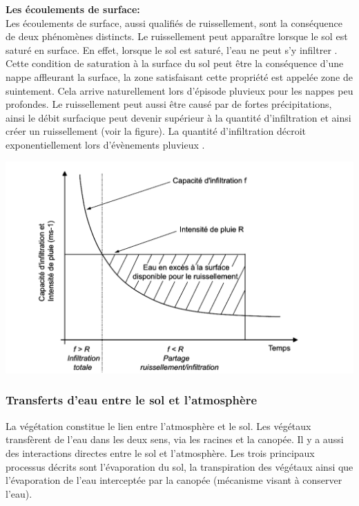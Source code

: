 \documentclass[a4paper,10pt]{article}
\begin{document}
\textbf{Les écoulements de surface:}\\

Les écoulements de surface, aussi qualifiés de ruissellement, sont la conséquence de deux phénomènes distincts. Le ruissellement peut apparaître lorsque le sol est saturé en surface. En effet, lorsque le sol est saturé, l’eau ne peut s’y infiltrer \cite{cappus1960etude}. Cette condition de saturation à la surface du sol peut être la conséquence d'une nappe affleurant la surface, la zone satisfaisant cette propriété est appelée zone de suintement. Cela arrive naturellement lors d'épisode pluvieux pour les nappes peu profondes. Le ruissellement peut aussi être causé par de fortes précipitations, ainsi le débit surfacique peut devenir supérieur à la quantité d'infiltration et ainsi créer un ruissellement (voir la figure). La quantité d'infiltration décroit exponentiellement lors d'évènements pluvieux \cite{horton1933role}.  

\begin{center}
	\includegraphics[scale=0.2]{ruissellement.png}
\end{center} 

\subsubsection{Transferts d'eau entre le sol et l'atmosphère}

La végétation constitue le lien entre l'atmosphère et le sol. Les végétaux transfèrent de l'eau dans les deux sens, via les racines et la canopée. Il y a aussi des interactions directes entre le sol et l'atmosphère. Les trois principaux processus décrits sont l'évaporation du sol, la transpiration des végétaux ainsi que l'évaporation de l'eau interceptée par la canopée (mécanisme visant à conserver l'eau).\\
\end{document}
